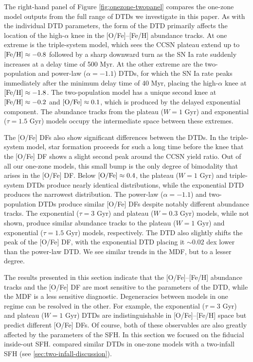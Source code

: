 \documentclass[twocolumn,twocolappendix,linenumbers]{aastex631}
\begin{document}
The right-hand panel of Figure \ref{fig:onezone-twopanel} compares the one-zone model outputs from the full range of DTDs we investigate in this paper. As with the individual DTD parameters, the form of the DTD primarily affects the location of the high-$\alpha$ knee in the [O/Fe]--[Fe/H] abundance tracks. At one extreme is the triple-system model, which sees the CCSN plateau extend up to ${\rm [Fe/H]}\approx-0.8$ followed by a sharp downward turn as the SN Ia rate suddenly increases at a delay time of 500 Myr. 
At the other extreme are the two-population and power-law ($\alpha=-1.1$) DTDs, for which the SN Ia rate peaks immediately after the minimum delay time of 40 Myr, placing the high-$\alpha$ knee at ${\rm [Fe/H]}\approx-1.8$. The two-population model has a unique second knee at ${\rm [Fe/H]}\approx-0.2$ and ${\rm [O/Fe]}\approx0.1$, which is produced by the delayed exponential component. The abundance tracks from the plateau ($W=1$ Gyr) and exponential ($\tau=1.5$ Gyr) models occupy the intermediate space between these extremes. 

The [O/Fe] DFs also show significant differences between the DTDs. In the triple-system model, star formation proceeds for such a long time before the knee that the [O/Fe] DF shows a slight second peak around the CCSN yield ratio. Out of all our one-zone models, this small bump is the only degree of bimodality that arises in the [O/Fe] DF. Below ${\rm [O/Fe]}\approx0.4$, the plateau ($W=1$ Gyr) and triple-system DTDs produce nearly identical distributions, while the exponential DTD produces the narrowest distribution. The power-law ($\alpha=-1.1$) and two-population DTDs produce similar [O/Fe] DFs despite notably different abundance tracks. The exponential ($\tau=3$ Gyr) and plateau ($W=0.3$ Gyr) models, while not shown, produce similar abundance tracks to the plateau ($W=1$ Gyr) and exponential ($\tau=1.5$ Gyr) models, respectively.
The DTD also slightly shifts the peak of the [O/Fe] DF, with the exponential DTD placing it $\sim 0.02$ dex lower than the power-law DTD. We see similar trends in the MDF, but to a lesser degree.

The results presented in this section indicate that the [O/Fe]--[Fe/H] abundance tracks and the [O/Fe] DF are most sensitive to the parameters of the DTD, while the MDF is a less sensitive diagnostic. Degeneracies between models in one regime can be resolved in the other. For example, the exponential ($\tau=3$ Gyr) and plateau ($W=1$ Gyr) DTDs are indistinguishable in [O/Fe]--[Fe/H] space but predict different [O/Fe] DFs. Of course, both of these observables are also greatly affected by the parameters of the SFH. In this section we focused on the fiducial inside-out SFH. \citet{Palicio2023-AnalyticDTD} compared similar DTDs in one-zone models with a two-infall SFH (see \ref{sec:two-infall-discussion}).
\end{document}
